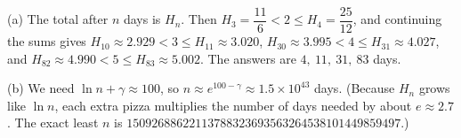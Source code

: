 (a) The total after $n$ days is $H_n$. Then $H_3=\dfrac{11}6<2\le H_4=\dfrac{25}{12}$, and continuing the sums gives $H_{10}\approx2.929<3\le H_{11}\approx3.020$, $H_{30}\approx3.995<4\le H_{31}\approx4.027$, and $H_{82}\approx4.990<5\le H_{83}\approx5.002$. The answers are $\boxed{4,\ 11,\ 31,\ 83}$ days.

(b) We need $\ln n+\gamma\approx100$, so $n\approx e^{100-\gamma}\approx\boxed{1.5\times10^{43}}$ days. (Because $H_n$ grows like $\ln n$, each extra pizza multiplies the number of days needed by about $e\approx2.7$. The exact least $n$ is $15092688622113788323693563264538101449859497$.)
